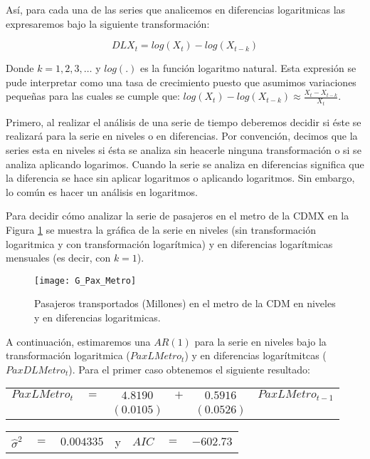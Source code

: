 \documentclass[
  a4paper,
]{article}
\begin{document}
Así, para cada una de las series que analicemos en diferencias
logaritmicas las expresaremos bajo la siguiente transformación:

\[
    DLX_t = log(X_t) - log(X_{t-k})
\]

Donde \(k = 1, 2, 3, \ldots\) y \(log(.)\) es la función logaritmo
natural. Esta expresión se pude interpretar como una tasa de crecimiento
puesto que asumimos variaciones pequeñas para las cuales se cumple que:
\(log(X_t) - log(X_{t-k}) \approx \frac{X_t - X_{t-k}}{X_t}\).

Primero, al realizar el análisis de una serie de tiempo deberemos
decidir si éste se realizará para la serie en niveles o en diferencias.
Por convención, decimos que la series esta en niveles si ésta se analiza
sin heacerle ninguna transformación o si se analiza aplicando logarimos.
Cuando la serie se analiza en diferencias significa que la diferencia se
hace sin aplicar logaritmos o aplicando logaritmos. Sin embargo, lo
común es hacer un análisis en logaritmos.

Para decidir cómo analizar la serie de pasajeros en el metro de la CDMX
en la Figura \ref{G_Pax_Metro} se muestra la gráfica de la serie en
niveles (sin transformación logaritmica y con transformación
logarítmica) y en diferencias logarítmicas mensuales (es decir, con
\(k = 1\)).

\begin{figure}
  \centering
    \texttt{[image: G\_Pax\_Metro]}
  \caption{Pasajeros transportados (Millones) en el metro de la CDM en niveles y en diferencias logaritmicas.}
  \label{G_Pax_Metro}
\end{figure}

A continuación, estimaremos una \(AR(1)\) para la serie en niveles bajo
la transformación logaritmica (\(PaxLMetro_t\)) y en diferencias
logarítmitcas (\(PaxDLMetro_t\)). Para el primer caso obtenemos el
siguiente resultado:

\begin{center}
\begin{tabular}{ c c c c c c } 
    $PaxLMetro_t$ & $=$ & $4.8190$ & $+$ & $0.5916$  & $PaxLMetro_{t-1}$ \\ 
    &  & $(0.0105)$ &  & $(0.0526)$ & 
\end{tabular}
\end{center}

\begin{center}
\begin{tabular}{ c c c c c c c } 
    $\hat{\sigma}^2$ & $=$ & $0.004335$ & y & $AIC$ & $=$ & $-602.73$ 
\end{tabular}
\end{center}
\end{document}
